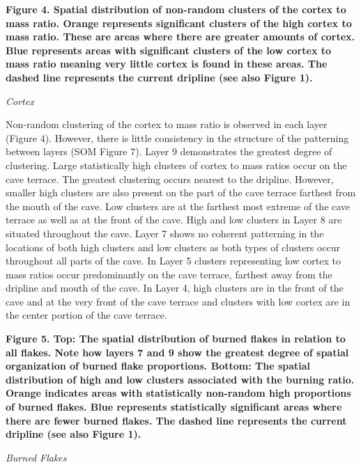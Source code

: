 \documentclass[smallextended]{svjour3}       %
\begin{document}
\textbf{Figure 4. Spatial distribution of non-random clusters of the
cortex to mass ratio. Orange represents significant clusters of the high
cortex to mass ratio. These are areas where there are greater amounts of
cortex. Blue represents areas with significant clusters of the low
cortex to mass ratio meaning very little cortex is found in these areas.
The dashed line represents the current dripline (see also Figure 1).}

\emph{Cortex}

Non-random clustering of the cortex to mass ratio is observed in each
layer (Figure 4). However, there is little consistency in the structure
of the patterning between layers (SOM Figure 7). Layer 9 demonstrates
the greatest degree of clustering. Large statistically high clusters of
cortex to mass ratios occur on the cave terrace. The greatest clustering
occurs nearest to the dripline. However, smaller high clusters are also
present on the part of the cave terrace farthest from the mouth of the
cave. Low clusters are at the farthest most extreme of the cave terrace
as well as at the front of the cave. High and low clusters in Layer 8
are situated throughout the cave. Layer 7 shows no coherent patterning
in the locations of both high clusters and low clusters as both types of
clusters occur throughout all parts of the cave. In Layer 5 clusters
representing low cortex to mass ratios occur predominantly on the cave
terrace, farthest away from the dripline and mouth of the cave. In Layer
4, high clusters are in the front of the cave and at the very front of
the cave terrace and clusters with low cortex are in the center portion
of the cave terrace.

\textbf{Figure 5. Top: The spatial distribution of burned flakes in
relation to all flakes. Note how layers 7 and 9 show the greatest degree
of spatial organization of burned flake proportions. Bottom: The spatial
distribution of high and low clusters associated with the burning ratio.
Orange indicates areas with statistically non-random high proportions of
burned flakes. Blue represents statistically significant areas where
there are fewer burned flakes. The dashed line represents the current
dripline (see also Figure 1).}

\emph{Burned Flakes}
\end{document}
